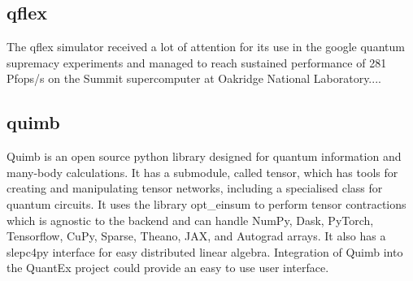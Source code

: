 \subsection{qflex}
The qflex simulator received a lot of attention for its use in the google quantum supremacy experiments \cite{Villalonga2019} and managed to reach sustained performance of 281 Pfops/s on the Summit supercomputer at Oakridge National Laboratory.... 

\subsection{quimb}
Quimb is an open source python library designed for quantum information and many-body calculations. It has a submodule, called tensor, which has tools for creating and manipulating tensor networks, including a specialised class for quantum circuits. It uses the library opt_einsum to perform tensor contractions which is agnostic to the backend and can handle NumPy, Dask, PyTorch, Tensorflow, CuPy, Sparse, Theano, JAX, and Autograd arrays. It also has a slepc4py interface for easy distributed linear algebra. Integration of Quimb into the QuantEx project could provide an easy to use user interface. 

